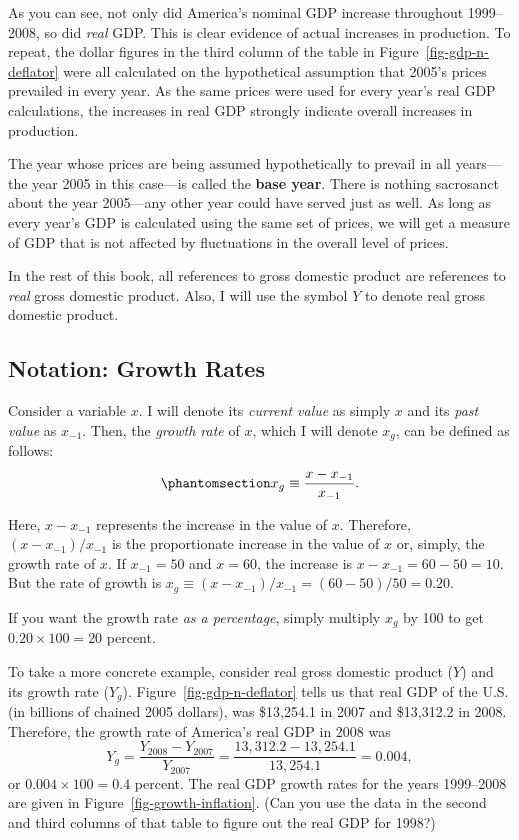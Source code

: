 \documentclass[
  letterpaper,
]{book}
\begin{document}
As you can see, not only did America's nominal GDP increase throughout
1999--2008, so did \emph{real} GDP. This is clear evidence of actual
increases in production. To repeat, the dollar figures in the third
column of the table in Figure~\ref{fig-gdp-n-deflator} were all
calculated on the hypothetical assumption that 2005's prices prevailed
in every year. As the same prices were used for every year's real GDP
calculations, the increases in real GDP strongly indicate overall
increases in production.

The year whose prices are being assumed hypothetically to prevail in all
years---the year 2005 in this case---is called the \textbf{base year}.
There is nothing sacrosanct about the year 2005---any other year could
have served just as well. As long as every year's GDP is calculated
using the same set of prices, we will get a measure of GDP that is not
affected by fluctuations in the overall level of prices.

In the rest of this book, all references to gross domestic product are
references to \emph{real} gross domestic product. Also, I will use the
symbol \(Y\) to denote real gross domestic product.

\subsection{Notation: Growth Rates}\label{sec-notngrowth}

Consider a variable \(x\). I will denote its \emph{current value} as
simply \(x\) and its \emph{past value} as \(x_{-1}\). Then, the
\emph{growth rate} of \(x\), which I will denote \(x_g\), can be defined
as follows: \begin{equation}\phantomsection\label{eq-growthrate}{
x_g\equiv\frac{x-x_{-1}}{x_{-1}}.
}\end{equation}

Here, \(x-x_{-1}\) represents the increase in the value of \(x\).
Therefore, \((x-x_{-1})/x_{-1}\) is the proportionate increase in the
value of \(x\) or, simply, the growth rate of \(x\). If \(x_{-1}=50\)
and \(x=60\), the increase is \(x-x_{-1}=60-50=10\). But the rate of
growth is \(x_g\equiv(x-x_{-1})/x_{-1}=(60-50)/50=0.20\).

If you want the growth rate \emph{as a percentage}, simply multiply
\(x_g\) by 100 to get \(0.20\times100=20\) percent.

To take a more concrete example, consider real gross domestic product
(\(Y\)) and its growth rate (\(Y_g\)). Figure~\ref{fig-gdp-n-deflator}
tells us that real GDP of the U.S. (in billions of chained 2005
dollars), was \$13,254.1 in 2007 and \$13,312.2 in 2008. Therefore, the
growth rate of America's real GDP in 2008 was \[
Y_g=\frac{Y_{2008}-Y_{2007}}{Y_{2007}}=\frac{13,312.2-13,254.1}{13,254.1}=0.004,
\] or \(0.004\times 100 =0.4\) percent. The real GDP growth rates for
the years 1999--2008 are given in Figure~\ref{fig-growth-inflation}.
(Can you use the data in the second and third columns of that table to
figure out the real GDP for 1998?)
\end{document}
